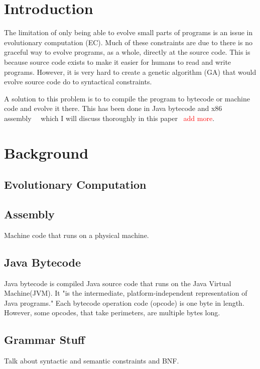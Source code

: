 \documentclass{sig-alternate}
\newcommand{\mycomment}[1]{\textcolor{red}{#1}}
\begin{document}
\terms{}

\keywords{}

\section{Introduction}
	The limitation of only being able to evolve small parts of programs is an issue in evolutionary computation (EC). Much of these constraints are due to there is no graceful way to evolve programs, as a whole, directly at the source code. This is because source code exists to make it easier for humans to read and write programs. However, it is very hard to create a genetic algorithm (GA) that would evolve source code do to syntactical constraints.\par
	A solution to this problem is to to compile the program to bytecode or machine code and evolve it there. This has been done in Java bytecode and x86 assembly~\cite{FINCH:2010}~\cite{Assembly:2010} which I will discuss thoroughly in this paper ~\mycomment{add more}.
	

	
	

\section{Background}

\subsection{Evolutionary Computation}
\subsection{Assembly}
Machine code that runs on a physical machine.
\subsection{Java Bytecode}
Java bytecode is compiled Java source code that runs on the Java Virtual Machine(JVM). It "is the intermediate, platform-independent representation of Java programs\cite{VIII:2011}." Each bytecode operation code (opcode) is one byte in length. However, some opcodes, that take perimeters, are multiple bytes long\cite{JavaBytecode:2014}.


\subsection{Grammar Stuff}
Talk about syntactic and semantic constraints and BNF.
\end{document}

